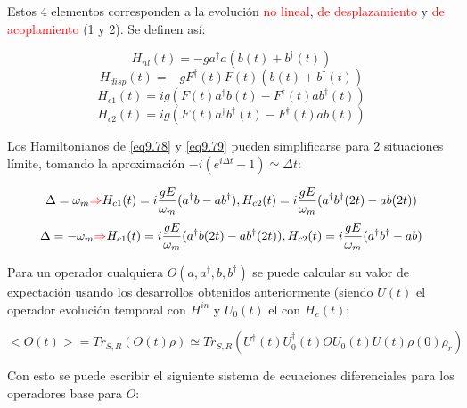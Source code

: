 \documentclass{book}
\begin{document}
Estos 4 elementos corresponden a la evolución \textcolor{red}{no lineal}, \textcolor{red}{de desplazamiento} y \textcolor{red}{de acoplamiento} (1 y 2). Se definen así:

\begin{equation}\label{eq9.76}H_{nl}(t)=-ga^\dag a(b(t)+b^\dag(t))\end{equation}
\begin{equation}\label{eq9.77}H_{disp}(t)=-gF^\dag(t)F(t)(b(t)+b^\dag(t))\end{equation}
\begin{equation}\label{eq9.78}H_{c1}(t)=ig(F(t)a^\dag b(t)-F^\dag(t)ab^\dag(t))\end{equation}
\begin{equation}\label{eq9.79}H_{c2}(t)=ig(F(t)a^\dag b^\dag(t)-F^\dag(t)ab(t))\end{equation}

Los Hamiltonianos de \ref{eq9.78} y \ref{eq9.79} pueden simplificarse para 2 situaciones límite, tomando la aproximación $-i(e^{i\Delta t}-1)\simeq \Delta t$:

\begin{equation}\label{eq9.80}\Delta=\omega_m\textcolor{red}{\Rightarrow}H_{c1}(t)=i\frac{gE}{\omega_m}(a^\dag b-ab^ \dag),H_{c2}(t)=i\frac{gE}{\omega_m}(a^\dag b^\dag(2t)-ab(2t))\end{equation}
\begin{equation}\label{eq9.81}\Delta=-\omega_m\textcolor{red}{\Rightarrow}H_{c1}(t)=i\frac{gE}{\omega_m}(a^\dag b(2t)-ab^ \dag(2t)),H_{c2}(t)=i\frac{gE}{\omega_m}(a^\dag b^\dag-ab)\end{equation}

Para un operador cualquiera $O(a,a^\dag,b,b^\dag)$ se puede calcular su valor de expectación usando los desarrollos obtenidos anteriormente (siendo $U(t)$ el operador evolución temporal con $H^{in}$ y $U_0(t)$ el con $H_e(t)$:

\begin{equation}\label{eq9.82}<O(t)>=Tr_{S,R}(O(t)\rho)\simeq Tr_{S,R}(U^\dag(t)U_0^\dag(t)OU_0(t)U(t)\rho(0)\rho_r)\end{equation}

Con esto se puede escribir el siguiente sistema de ecuaciones diferenciales para los operadores base para $O$:
\end{document}
